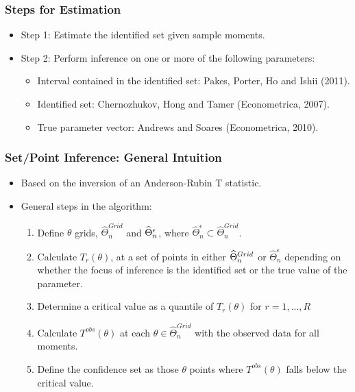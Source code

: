 \documentclass[notes=show]{beamer}
\begin{document}

\begin{frame}
\frametitle{Steps for Estimation}

\begin{itemize}
\item Step 1: Estimate the identified set given sample moments. 

\item Step 2: Perform inference on one or more of the following parameters: 

\begin{itemize}
\item Interval contained in the identified set: Pakes, Porter, Ho and Ishii
(2011). 

\item Identified set: Chernozhukov, Hong and Tamer (Econometrica, 2007). 

\item True parameter vector: Andrews and Soares (Econometrica, 2010). 
\end{itemize}
\end{itemize}
\end{frame}



\begin{frame}
\frametitle{Set/Point Inference: General Intuition}

\begin{itemize}
\item Based on the inversion of an Anderson-Rubin T statistic. 

\item General steps in the algorithm: 

\begin{enumerate}
\item Define $\theta $ grids, $\widehat{\Theta }_{n}^{Grid}$ and $\widehat{%
\Theta }_{n}^{\epsilon }$, where $\widehat{\Theta }_{n}^{\epsilon }\subset 
\widehat{\Theta }_{n}^{Grid}$. 

\item Calculate $T_{r}(\theta )$, at a set of points in either $\widehat{%
\Theta }_{n}^{Grid}$ or $\widehat{\Theta }_{n}^{\epsilon }$ depending on
whether the focus of inference is the identified set or the true value of
the parameter. 

\item Determine a critical value as a quantile of $T_{r}(\theta)$ for $%
r=1,...,R$ 

\item Calculate $T^{obs}(\theta )$ at each $\theta \in \widehat{\Theta }%
_{n}^{Grid}$ with the observed data for all moments. 

\item Define the confidence set as those $\theta$ points where $%
T^{obs}(\theta)$ falls below the critical value. 
\end{enumerate}
\end{itemize}
\end{frame}
\end{document}
